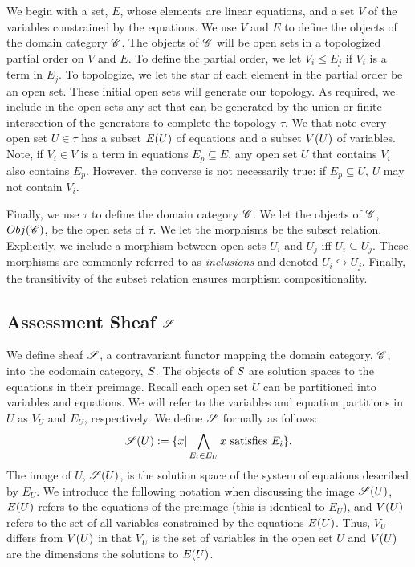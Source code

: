 \documentclass{article}
\begin{document}
We begin with a set, $E$, whose elements are linear equations, and a set $V$ of
the variables constrained by the equations. We use $V$ and $E$ to define the
objects of the domain category $\mathscr{C}$. The objects of $\mathscr{C}$ will be
open sets in a topologized partial order on $V$ and $E$. To define the partial
order, we let $V_i \leq E_j$ if $V_i$ is a term in $E_j$. To topologize, we let
the star of each element in the partial order be an open set. These initial
open sets will generate our topology. As required, we include in the open sets
any set that can be generated by the union or finite intersection of the
generators to complete the topology $\tau$.  We that note every open set $U \in
\tau$ has a subset $E({U})$ of equations and a subset $V({U})$ of variables.
Note, if $V_i \in V$ is a term in equations $E_p \subseteq E$, any open set $U$
that contains $V_i$ also contains $E_p$. However, the converse is not
necessarily true: if $E_p \subseteq U$, $U$ may not contain $V_i$.

Finally, we use $\tau$ to define the domain category $\mathscr{C}$. We let the
objects of $\mathscr{C}$, $Obj(\mathscr{C})$, be the open sets of $\tau$. We let the
morphisms be the subset relation. Explicitly, we include a morphism between
open sets $U_i$ and $U_j$ iff $U_i \subseteq U_j$.  These morphisms are
commonly referred to as \emph{inclusions} and denoted $U_i \hookrightarrow
U_j$. Finally, the transitivity of the subset relation ensures morphism
compositionality.


\subsection{Assessment Sheaf $\mathscr{S}$}
\label{mainSheafDef}

We define sheaf $\mathscr{S}$, a contravariant functor mapping the domain category,
$\mathscr{C}$, into the codomain category, $S$. The objects of $S$
are solution spaces to the equations in their preimage. Recall each open set $U$
can be partitioned into variables and equations. We will refer to the variables and
equation partitions in $U$ as $V_U$ and $E_U$, respectively. 
We define $\mathscr{S}$ formally as follows:
\begin{equation} 
 \mathscr{S}(U) := \{ x | \bigwedge\limits_{E_i \in E_U} x \text{ satisfies } E_i\}.
\end{equation}
The image of $U$, $\mathscr{S}(U)$, is the solution space of the system of equations
described by $E_U$.  We introduce the following notation when discussing the
image $\mathscr{S}(U)$, $E({U})$ refers to the equations of the preimage (this is
identical to  $E_U$), and $V({U})$ refers to the set of all variables
constrained by the equations $E({U})$. Thus, $V_U$ differs from $V({U})$ in
that $V_U$ is the set of variables in the open set $U$ and $V({U})$ are the
dimensions the solutions to $E({U})$.
\end{document}
